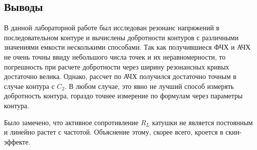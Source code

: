 \documentclass[a4paper, 12pt]{article}
\begin{document}
	\subsection*{Выводы}

	В данной лабораторной работе был исследован резонанс напряжений в последовательном контуре и вычислены добротности контуров с различными значениями емкости несколькими способами. Так как получившиеся ФЧХ и АЧХ не очень точны ввиду небольшого числа точек и их неравномерности, то погрешность при расчете добротности через ширину резонансных кривых достаточно велика. Однако, рассчет по АЧХ получился достаточно точным в случае контура с $C_2$. В любом случае, это явно не лучший способ измерять добротность контура, гораздо точнее измерение по формулам через параметры контура.

	Было замечено, что активное сопротивление $R_L$ катушки не является постоянным и линейно растет с частотой. Объяснение этому, скорее всего, кроется в скин-эффекте.
\end{document}
